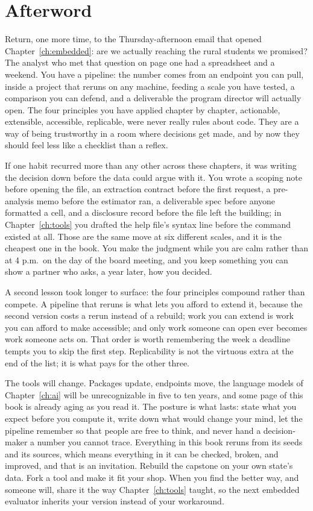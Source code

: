 \documentclass[
    a4paper,
    fontsize=10pt,
    twoside=true,
    numbers=noenddot,
]{kaobook}
\begin{document}

\chapter*{Afterword}
Return, one more time, to the Thursday-afternoon email that opened Chapter~\ref{ch:embedded}: are we actually reaching the rural students we promised? The analyst who met that question on page one had a spreadsheet and a weekend. You have a pipeline: the number comes from an endpoint you can pull, inside a project that reruns on any machine, feeding a scale you have tested, a comparison you can defend, and a deliverable the program director will actually open. The four principles you have applied chapter by chapter, actionable, extensible, accessible, replicable, were never really rules about code. They are a way of being trustworthy in a room where decisions get made, and by now they should feel less like a checklist than a reflex.

If one habit recurred more than any other across these chapters, it was writing the decision down before the data could argue with it. You wrote a scoping note before opening the file, an extraction contract before the first request, a pre-analysis memo before the estimator ran, a deliverable spec before anyone formatted a cell, and a disclosure record before the file left the building; in Chapter~\ref{ch:tools} you drafted the help file's syntax line before the command existed at all. Those are the same move at six different scales, and it is the cheapest one in the book. You make the judgment while you are calm rather than at 4 p.m.\ on the day of the board meeting, and you keep something you can show a partner who asks, a year later, how you decided.

A second lesson took longer to surface: the four principles compound rather than compete. A pipeline that reruns is what lets you afford to extend it, because the second version costs a rerun instead of a rebuild; work you can extend is work you can afford to make accessible; and only work someone can open ever becomes work someone acts on. That order is worth remembering the week a deadline tempts you to skip the first step. Replicability is not the virtuous extra at the end of the list; it is what pays for the other three.

The tools will change. Packages update, endpoints move, the language models of Chapter~\ref{ch:ai} will be unrecognizable in five to ten years, and some page of this book is already aging as you read it. The posture is what lasts: state what you expect before you compute it, write down what would change your mind, let the pipeline remember so that people are free to think, and never hand a decision-maker a number you cannot trace. Everything in this book reruns from its seeds and its sources, which means everything in it can be checked, broken, and improved, and that is an invitation. Rebuild the capstone on your own state's data. Fork a tool and make it fit your shop. When you find the better way, and someone will, share it the way Chapter~\ref{ch:tools} taught, so the next embedded evaluator inherits your version instead of your workaround.
\end{document}
